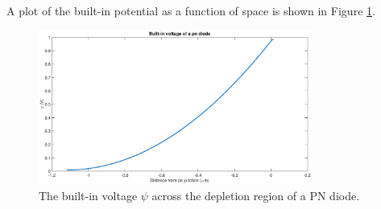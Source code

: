 	A plot of the built-in potential as a function of space is shown in Figure \ref{fig::built_in}.
	
	\begin{figure}[H]
		\centering
		\includegraphics[width=0.8\textwidth]{./img/2c_psi}
		\caption{The built-in voltage $\psi$ across the depletion region of a PN diode.}
		\label{fig::built_in}
	\end{figure}

